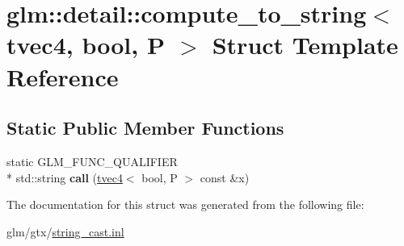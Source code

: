 \hypertarget{structglm_1_1detail_1_1compute__to__string_3_01tvec4_00_01bool_00_01P_01_4}{\section{glm\-:\-:detail\-:\-:compute\-\_\-to\-\_\-string$<$ tvec4, bool, P $>$ Struct Template Reference}
\label{structglm_1_1detail_1_1compute__to__string_3_01tvec4_00_01bool_00_01P_01_4}
}
\subsection*{Static Public Member Functions}
\begin{DoxyCompactItemize}
\item 
\hypertarget{structglm_1_1detail_1_1compute__to__string_3_01tvec4_00_01bool_00_01P_01_4_a22a41058af4ceb92f6c12ad968a4205d}{static G\-L\-M\-\_\-\-F\-U\-N\-C\-\_\-\-Q\-U\-A\-L\-I\-F\-I\-E\-R \\*
std\-::string {\bfseries call} (\hyperlink{structglm_1_1tvec4}{tvec4}$<$ bool, P $>$ const \&x)}\label{structglm_1_1detail_1_1compute__to__string_3_01tvec4_00_01bool_00_01P_01_4_a22a41058af4ceb92f6c12ad968a4205d}

\end{DoxyCompactItemize}


The documentation for this struct was generated from the following file\-:\begin{DoxyCompactItemize}
\item 
glm/gtx/\hyperlink{string__cast_8inl}{string\-\_\-cast.\-inl}\end{DoxyCompactItemize}
